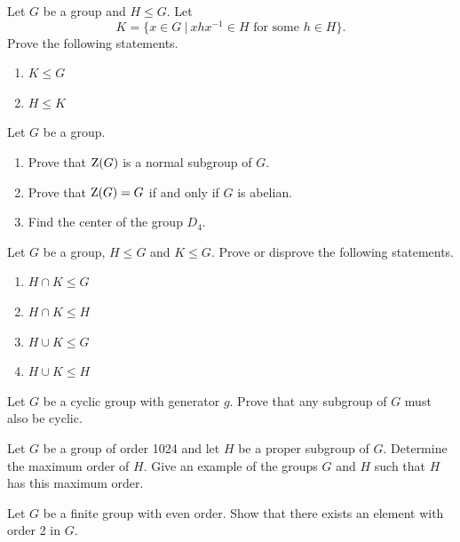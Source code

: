 \begin{problem}
    Let $G$ be a group and $H \leq G$. Let
    \[
        K = \{x \in G \ | \ xhx^{-1} \in H \text{ for some } h \in H \}.
    \]
    Prove the following statements.
    \begin{enumerate}[label=(\alph*)]
        \item $K \leq G$
        \item $H \leq K$
    \end{enumerate}
\end{problem}

\begin{problem}\label{problem-center-of-G}
    Let $G$ be a group.
    \begin{enumerate}[label=(\alph*)]
        \item Prove that $\mathrm{Z}(G)$ is a normal subgroup of $G$.
        \item Prove that $\mathrm{Z}(G) = G$ if and only if $G$ is abelian.
        \item Find the center of the group $D_4$.
    \end{enumerate}
\end{problem}

\begin{problem}\label{problem-intersection-of-subgroups}
    Let $G$ be a group, $H \leq G$ and $K \leq G$. Prove or disprove the following statements.
    \begin{enumerate}[label=(\alph*)]
        \item $H \cap K \leq G$
        \item $H \cap K \leq H$
        \item $H \cup K \leq G$
        \item $H \cup K \leq H$
    \end{enumerate}
\end{problem}

\begin{problem}\label{problem-subgroup-of-cyclic-group-is-cyclic}
    Let $G$ be a cyclic group with generator $g$. Prove that any subgroup of $G$ must also be cyclic.
\end{problem}

\begin{problem}
    Let $G$ be a group of order 1024 and let $H$ be a proper subgroup of $G$. Determine the maximum order of $H$. Give an example of the groups $G$ and $H$ such that $H$ has this maximum order.
\end{problem}

\begin{problem}
    Let $G$ be a finite group with even order. Show that there exists an element with order 2 in $G$.
\end{problem}

